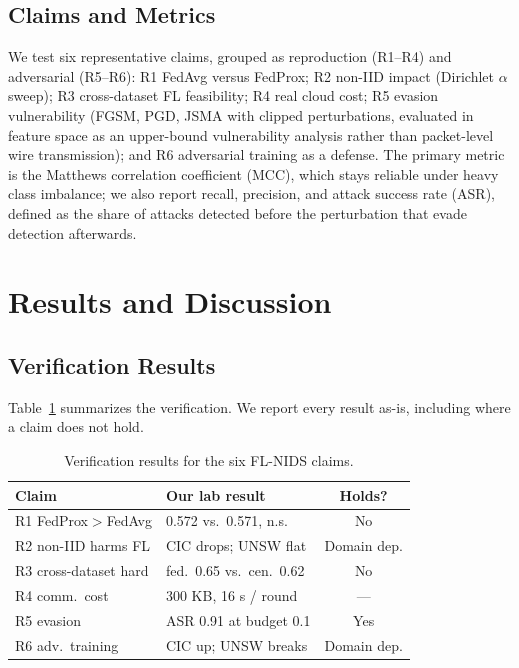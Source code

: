 \documentclass[conference]{IEEEtran}
\begin{document}
\subsection{Claims and Metrics}
We test six representative claims, grouped as reproduction (R1--R4) and adversarial
(R5--R6): R1 FedAvg versus FedProx; R2 non-IID impact (Dirichlet $\alpha$ sweep); R3
cross-dataset FL feasibility; R4 real cloud cost; R5 evasion vulnerability (FGSM, PGD,
JSMA with clipped perturbations, evaluated in feature space as an upper-bound vulnerability analysis
rather than packet-level wire transmission); and R6 adversarial training as a defense. The
primary metric is the Matthews correlation coefficient (MCC), which stays reliable
under heavy class imbalance; we also report recall, precision, and attack success rate (ASR), defined as the share of attacks detected before the perturbation that evade detection afterwards.

\section{Results and Discussion}
\label{sec:results}
\subsection{Verification Results}
Table~\ref{tab:results} summarizes the verification. We report every result as-is,
including where a claim does not hold.

\begin{table}[htbp]
\caption{Verification results for the six FL-NIDS claims.}
\label{tab:results}
\begin{center}
\footnotesize
\begin{tabular}{|l|l|c|}
\hline
\textbf{Claim} & \textbf{Our lab result} & \textbf{Holds?} \\
\hline
R1 FedProx$>$FedAvg & 0.572 vs.\ 0.571, n.s. & No \\
R2 non-IID harms FL & CIC drops; UNSW flat & Domain dep. \\
R3 cross-dataset hard & fed.\ 0.65 vs.\ cen.\ 0.62 & No \\
R4 comm.\ cost & 300 KB, 16 s / round & --- \\
R5 evasion & ASR 0.91 at budget 0.1 & Yes \\
R6 adv.\ training & CIC up; UNSW breaks & Domain dep. \\
\hline
\end{tabular}
\end{center}
\end{table}
\end{document}
